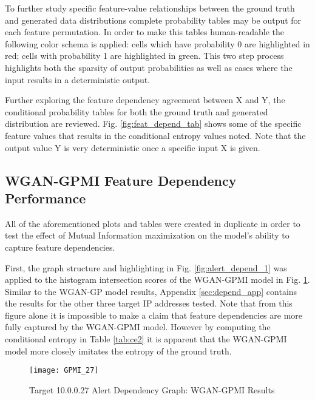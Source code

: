 To further study specific feature-value relationships between the ground truth and generated data distributions complete probability tables may be output for each feature permutation. In order to make this tables human-readable the following color schema is applied: cells which have probability 0 are highlighted in red; cells with probability 1 are highlighted in green. This two step process highlights both the sparsity of output probabilities as well as cases where the input results in a deterministic output.

Further exploring the feature dependency agreement between X and Y, the conditional probability tables for both the ground truth and generated distribution are reviewed. Fig. \ref{fig:feat_depend_tab} shows some of the specific feature values that results in the conditional entropy values noted. Note that the output value Y is very deterministic once a specific input X is given.



\subsection{WGAN-GPMI Feature Dependency Performance}

All of the aforementioned plots and tables were created in duplicate in order to test the effect of Mutual Information maximization on the model's ability to capture feature dependencies.

First, the graph structure and highlighting in Fig. \ref{fig:alert_depend_1} was applied to the histogram intersection scores of the WGAN-GPMI model in Fig. \ref{fig:alert_depend_5}. Similar to the WGAN-GP model results, Appendix \ref{sec:depend_app} contains the results for the other three target IP addresses tested. Note that from this figure alone it is impossible to make a claim that feature dependencies are more fully captured by the WGAN-GPMI model. However by computing the conditional entropy in Table \ref{tab:ce2} it is apparent that the WGAN-GPMI model more closely imitates the entropy of the ground truth.

\begin{figure}[!htbp]
	\centering
	\texttt{[image: GPMI\_27]}
	\caption{
		Target 10.0.0.27 Alert Dependency Graph: WGAN-GPMI Results
	}
	\label{fig:alert_depend_5}
\end{figure}

